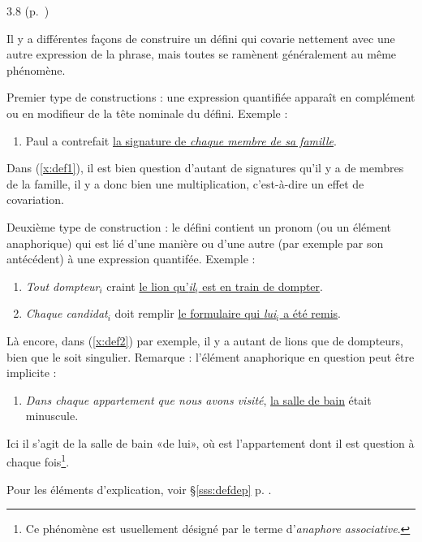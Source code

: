 \begin{Solution}{3.{8}}
 (p.~\pageref{exo:DefCovar})\label{crg:DefCovar}

Il y a différentes façons de construire un {\GN} défini qui covarie
nettement avec une autre expression de la phrase, mais toutes se
ramènent généralement au même phénomène.

Premier type de constructions : une expression quantifiée apparaît en
complément ou en modifieur de la tête nominale du {\GN} défini.  Exemple :

\begin{enumerate}[label=(\arabic*)]
\item \label{x:def1}
Paul a contrefait \underline{la signature de \emph{chaque membre
  de sa famille}}.
\end{enumerate}


Dans (\ref{x:def1}), il est bien question d'autant de signatures qu'il
y a de membres de la famille, il y a donc bien une multiplication,
c'est-à-dire un effet de covariation.

Deuxième type de construction : le {\GN} défini contient un pronom (ou un
élément anaphorique) qui est lié d'une manière ou d'une autre (par
exemple par son antécédent) à une expression quantifée.  Exemple :

\begin{enumerate}[label=(\arabic*),resume]
\item \label{x:def2}
\emph{Tout dompteur$_i$} craint \underline{le lion qu'\emph{il$_i$}
est en train de dompter}.

\item
\emph{Chaque candidat$_i$} doit remplir \underline{le formulaire qui
\emph{lui$_i$} a été remis}.
\end{enumerate}

Là encore, dans (\ref{x:def2}) par exemple, il y a autant de lions que
de dompteurs, bien que le {\GN} soit singulier.
Remarque : l'élément anaphorique en question peut être implicite :

\begin{enumerate}[label=(\arabic*),resume]
\item \emph{Dans chaque appartement que nous avons visité}, \underline{la salle de bain} était minuscule.
\end{enumerate}

Ici il s'agit de la salle de bain «de lui», où 
est l'appartement dont il est question à chaque fois\footnote{Ce phénomène est usuellement désigné par le terme d'\emph{anaphore associative}.}.

Pour les éléments d'explication, voir \S\ref{sss:defdep} p. \pageref{sss:defdep}.

\end{Solution}
